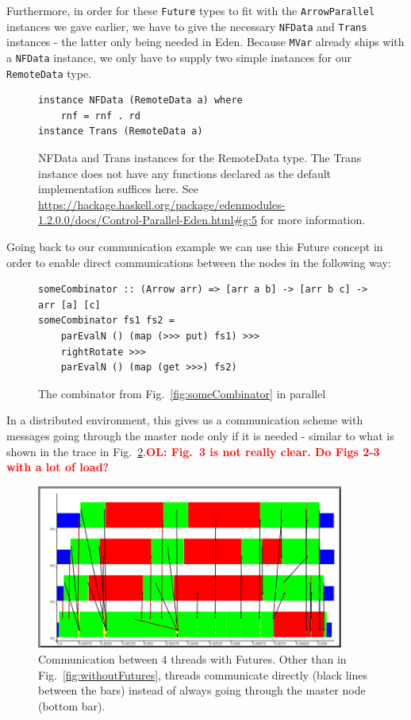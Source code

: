 \documentclass{jfp1}
\newcommand{\inlinecode}[1]{\texttt{#1}}
\newcommand{\comm}[2]{\textcolor{red}{\bfseries #1: #2}}
\newcommand{\olcomment}[1]{\comm{OL}{#1}}
\begin{document}
Furthermore, in order for these \inlinecode{Future} types to fit with the \inlinecode{ArrowParallel} instances we gave earlier, we have to give the necessary \inlinecode{NFData} and \inlinecode{Trans} instances - the latter only being needed in Eden. Because \inlinecode{MVar} already ships with a \inlinecode{NFData} instance, we only have to supply two simple instances for our \inlinecode{RemoteData} type.
\begin{figure}[h]
\begin{lstlisting}[frame=htrbl]
instance NFData (RemoteData a) where
    rnf = rnf . rd
instance Trans (RemoteData a)
\end{lstlisting}
\caption{NFData and Trans instances for the RemoteData type. The Trans instance does not have any functions declared as the default implementation suffices here. See \url{https://hackage.haskell.org/package/edenmodules-1.2.0.0/docs/Control-Parallel-Eden.html\#g:5} for more information.}
\end{figure}

Going back to our communication example we can use this Future concept in order to enable direct communications between the nodes in the following way:
\begin{figure}[h]
\begin{lstlisting}[frame=htrbl]
someCombinator :: (Arrow arr) => [arr a b] -> [arr b c] -> arr [a] [c]
someCombinator fs1 fs2 =
	parEvalN () (map (>>> put) fs1) >>>
	rightRotate >>>
	parEvalN () (map (get >>>) fs2)
\end{lstlisting}
\caption{The combinator from Fig.~\ref{fig:someCombinator} in parallel}
\label{fig:someCombinatorParallel}
\end{figure}
In a distributed environment, this gives us a communication scheme with messages going through the master node only if it is needed - similar to what is shown in the trace in Fig.~\ref{fig:withFutures}.\olcomment{Fig.~3 is not really clear. Do Figs 2-3 with a lot of load?}
\begin{figure}[ht]
	\centering
	\includegraphics[width=0.9\textwidth]{images/withFutures}
	\caption[with Futures]{Communication between 4 threads with Futures. Other than in Fig.~\ref{fig:withoutFutures}, threads communicate directly (black lines between the bars) instead of always going through the master node (bottom bar).}
	\label{fig:withFutures}
\end{figure}
	
\end{document}
